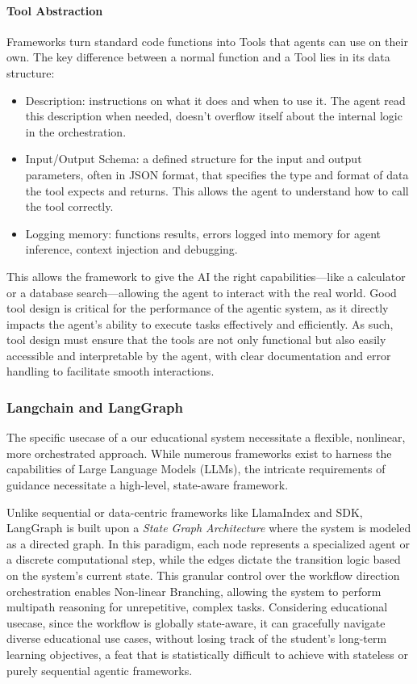 \paragraph*{{Tool Abstraction}}
Frameworks turn standard code functions into Tools that agents can use on their own. The key difference between a normal function and a Tool lies in its data structure: 
\begin{itemize}
    \item {Description:} instructions on what it does and when to use it. The agent read this description when needed, doesn't overflow itself about the internal logic in the orchestration.
    \item {Input/Output Schema:} a defined structure for the input and output parameters, often in JSON format, that specifies the type and format of data the tool expects and returns. This allows the agent to understand how to call the tool correctly.
    \item {Logging memory:} functions results, errors logged into memory for agent inference, context injection and debugging.
\end{itemize}

This allows the framework to give the AI the right capabilities—like a calculator or a database search—allowing the agent to interact with the real world.
Good tool design is critical for the performance of the agentic system, as it directly impacts the agent's ability to execute tasks effectively and efficiently. 
As such, tool design must ensure that the tools are not only functional but also easily accessible and interpretable by the agent, with clear documentation and 
error handling to facilitate smooth interactions.

\subsubsection*{Langchain and LangGraph}\label{subsub:lang_intro}
The specific usecase of a our educational system necessitate a flexible, nonlinear, more orchestrated approach. While numerous frameworks exist to harness the 
capabilities of Large Language Models (LLMs), the intricate requirements of  guidance necessitate a high-level, state-aware framework.

Unlike sequential or data-centric frameworks like LlamaIndex and SDK, LangGraph is built upon a \textit{State Graph Architecture} where the system is modeled 
as a directed graph. In this paradigm, each node represents a specialized agent or a discrete computational step, while the edges 
dictate the transition logic based on the system’s current state. 
This granular control over the workflow direction orchestration enables {Non-linear Branching}, allowing the system to perform multipath reasoning for unrepetitive, complex tasks. 
Considering educational usecase, since the workflow is globally state-aware, it can gracefully navigate diverse educational use 
cases, without losing track of the student's long-term learning objectives, a feat that is statistically difficult to achieve 
with stateless or purely sequential agentic frameworks.


